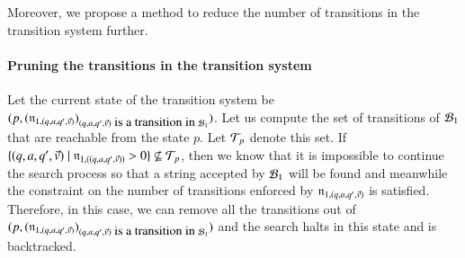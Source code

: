 Moreover, we propose a method to reduce the number of transitions in the transition system further. 

\paragraph*{Pruning the transitions in the transition system}
Let the current state of the transition system be $(p, (\mathfrak{n}_{1, (q, a, q', \vec{v})})_{(q, a, q', \vec{v})\mbox{ is a transition in } \mathcal{B}_1})$. 
Let us compute the set of transitions of $\mathcal{B}_1$ that are reachable from the state $p$. Let $\mathcal{T}_p$ denote this set. If $\{(q, a, q', \vec{v}) \mid \mathfrak{n}_{1, ((q, a, q', \vec{v}))} > 0\} \not \subseteq \mathcal{T}_p$, then we know that it is impossible to continue the search process so that a string accepted by $\mathcal{B}_1$ will be found and meanwhile the constraint on the number of transitions enforced by $\mathfrak{n}_{1, (q, a, q', \vec{v})}$ is satisfied. Therefore, in this case, we can remove all the transitions out of $(p, (\mathfrak{n}_{1, (q, a, q', \vec{v})})_{(q, a, q', \vec{v})\mbox{ is a transition in } \mathcal{B}_1})$ and the search halts in this state and is backtracked. 


